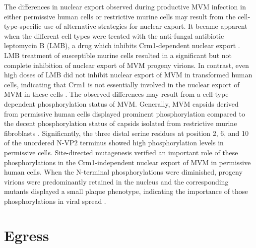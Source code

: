 The differences in nuclear export observed during productive MVM infection in either permissive human cells or restrictive murine cells may result from the cell-type-specific use of alternative strategies for nuclear export. It became apparent when the different cell types were treated with the anti-fungal antibiotic leptomycin B (LMB), a drug which inhibits Crm1-dependent nuclear export \cite{pmid9683540}. LMB treatment of susceptible murine cells resulted in a significant but not complete inhibition of nuclear export of MVM progeny virions. In contrast, even high doses of LMB did not inhibit nuclear export of MVM in transformed human cells, indicating that Crm1 is not essentially involved in the nuclear export of MVM in these cells \cite{pmid15367635}. The observed differences may result from a cell-type dependent phosphorylation status of MVM. Generally, MVM capsids derived from permissive human cells displayed prominent phosphorylation compared to the decent phosphorylation status of capsids isolated from restrictive murine fibroblasts \cite{pmid11069983}. Significantly, the three distal serine residues at position 2, 6, and 10 of the unordered N-VP2 terminus showed high phosphorylation levels in permissive cells. Site-directed mutagenesis verified an important role of these phosphorylations in the Crm1-independent nuclear export of MVM in permissive human cells. When the N-terminal phosphorylations were diminished, progeny virions were predominantly retained in the nucleus and the corresponding mutants displayed a small plaque phenotype, indicating the importance of those phosphorylations in viral spread \cite{pmid15367635}. 


\section{Egress}

